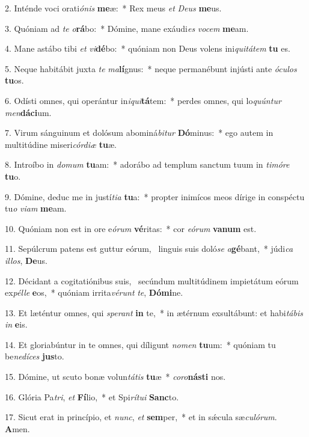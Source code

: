 2. Inténde voci orati\textit{ó}\textit{nis} \textbf{me}æ:~*  Rex meus \textit{et} \textit{De}\textit{us} \textbf{me}us.\

3. Quóniam ad \textit{te} \textit{o}\textbf{rá}bo:~*  Dómine, mane exáudi\textit{es} \textit{vo}\textit{cem} \textbf{me}am.\

4. Mane astábo tibi \textit{et} \textit{vi}\textbf{dé}bo:~*  quóniam non Deus volens ini\textit{qui}\textit{tá}\textit{tem} \textbf{tu} es.\

5. Neque habitábit juxta \textit{te} \textit{ma}\textbf{lí}gnus:~*  neque permanébunt injústi ante \textit{ó}\textit{cu}\textit{los} \textbf{tu}os.\

6. Odísti omnes, qui operántur in\textit{i}\textit{qui}\textbf{tá}tem:~*  perdes omnes, qui lo\textit{quún}\textit{tur} \textit{men}\textbf{dá}\textbf{ci}um.\

7. Virum sánguinum et dolósum abominá\textit{bi}\textit{tur} \textbf{Dó}minus:~*  ego autem in multitúdine miseri\textit{cór}\textit{di}\textit{æ} \textbf{tu}æ.\

8. Introíbo in \textit{do}\textit{mum} \textbf{tu}am:~*  adorábo ad templum sanctum tuum in \textit{ti}\textit{mó}\textit{re} \textbf{tu}o.\

9. Dómine, deduc me in justí\textit{ti}\textit{a} \textbf{tu}a:~*  propter inimícos meos dírige in conspéctu tu\textit{o} \textit{vi}\textit{am} \textbf{me}am.\

10. Quóniam non est in ore e\textit{ó}\textit{rum} \textbf{vé}ritas:~*  cor \textit{e}\textit{ó}\textit{rum} \textbf{va}\textbf{num} est.\

11. Sepúlcrum patens est guttur eórum, \dag\  linguis suis doló\textit{se} \textit{a}\textbf{gé}bant,~*  júdi\textit{ca} \textit{il}\textit{los}, \textbf{De}us.\

12. Décidant a cogitatiónibus suis, \dag\  secúndum multitúdinem impietátum eórum ex\textit{pél}\textit{le} \textbf{e}os,~*  quóniam irrita\textit{vé}\textit{runt} \textit{te}, \textbf{Dó}\textbf{mi}ne.\

13. Et læténtur omnes, qui \textit{spe}\textit{rant} \textbf{in} te,~*  in ætérnum exsultábunt: et habi\textit{tá}\textit{bis} \textit{in} \textbf{e}is.\

14. Et gloriabúntur in te omnes, qui díligunt \textit{no}\textit{men} \textbf{tu}um:~*  quóniam tu be\textit{ne}\textit{dí}\textit{ces} \textbf{jus}to.\

15. Dómine, ut scuto bonæ volun\textit{tá}\textit{tis} \textbf{tu}æ~*  \textit{co}\textit{ro}\textbf{nás}\textbf{ti} nos.\

16. Glória Pa\textit{tri}, \textit{et} \textbf{Fí}lio,~*  et Spi\textit{rí}\textit{tu}\textit{i} \textbf{Sanc}to.\

17. Sicut erat in princípio, et \textit{nunc}, \textit{et} \textbf{sem}per,~*  et in sǽcula sæ\textit{cu}\textit{ló}\textit{rum}. \textbf{A}men.\

